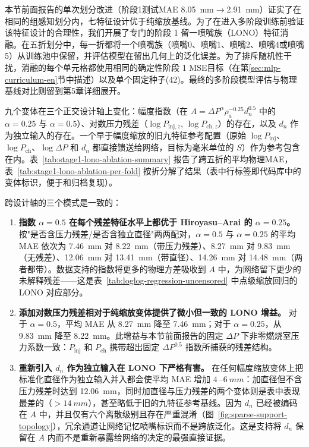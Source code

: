 本节前面报告的单次划分改进（阶段1测试MAE \SI{8.05}{mm}\(\to\)\SI{2.91}{mm}）证实了在相同的组感知划分内，七特征设计优于纯缩放基线。为了在进入多阶段训练前验证该特征设计的合理性，我们开展了专门的阶段 1 留一喷嘴族（LONO）特征消融。在五折划分中，每一折都将一个喷嘴族（喷嘴0、喷嘴1、喷嘴2、喷嘴4或喷嘴5）从训练池中保留，并评估模型在留出几何上的泛化误差。为了排斥随机性干扰，消融的每个单元格都使用相同的确定性阶段 1 MSE目标（在第\ref{sec:mlp-curriculum-en}节中描述）以及单个固定种子(42)。最终的多阶段模型评估与物理基线对比则留到第5章详细展开。

九个变体在三个正交设计轴上变化：幅度指数（在 \(A=\Delta P^{\alpha}\rho_a^{-0.25}d_n^{0.5}\) 中的 \(\alpha=0.25\) 与 \(\alpha=0.5\)）、对数压力残差（\(\log P_{\mathrm{inj},z}\), \(\log P_{\mathrm{ch},z}\)）的存在，以及 \(d_n\) 作为独立输入的存在。一个早于幅度缩放的旧九特征参考配置（原始 \(\log P_{\mathrm{inj}}\)、\(\log P_{\mathrm{ch}}\)、\(\log\Delta P\) 和 \(d_n\) 都直接馈送给网络，目标为毫米单位的 \(S\)）作为参考包含在内。表~\ref{tab:stage1-lono-ablation-summary} 报告了跨五折的平均物理MAE，表~\ref{tab:stage1-lono-ablation-per-fold} 按折分解了结果（表中行标签即代码库中的变体标识，便于和归档复现）。

跨设计轴的三个模式是一致的：
\begin{enumerate}
\item \textbf{指数 \(\alpha=0.5\) 在每个残差特征水平上都优于 Hiroyasu--Arai 的 \(\alpha=0.25\)。} 按"是否含压力残差/是否含独立直径"两两配对，\(\alpha=0.5\) 与 \(\alpha=0.25\) 的平均 MAE 依次为 \SI{7.46}{mm} 对 \SI{8.22}{mm}（带压力残差）、\SI{8.27}{mm} 对 \SI{9.83}{mm}（无残差）、\SI{12.06}{mm} 对 \SI{13.41}{mm}（带直径）、\SI{14.26}{mm} 对 \SI{14.48}{mm}（两者都带）。数据支持的指数将更多的物理方差吸收到 \(A\) 中，为网络留下更少的未解释残差——这是表~\ref{tab:loglog-regression-uncensored} 中点级缩放回归的 LONO 对应部分。
\item \textbf{添加对数压力残差相对于纯缩放变体提供了微小但一致的 LONO 增益。} 对于 \(\alpha=0.5\)，平均 MAE 从 \SI{8.27}{mm} 降至 \SI{7.46}{mm}；对于 \(\alpha=0.25\)，从 \SI{9.83}{mm} 降至 \SI{8.22}{mm}。此增益与本节前面报告的固定 \(\Delta P\) 下非零燃烧室压力系数一致：\(P_{\mathrm{inj}}\) 和 \(P_{\mathrm{ch}}\) 携带超出固定 \(\Delta P^{0.5}\) 指数所捕获的残差结构。
\item \textbf{重新引入 \(d_n\) 作为独立输入在 LONO 下严格有害。} 在任何幅度缩放变体上把标准化直径作为独立输入并入都会使平均 MAE 增加 \(\SI{4}{}\)--\(\SI{6}{mm}\)：加直径但不含压力残差时达到 \SI{12.06}{mm}，同时加直径与压力残差的两个变体则是表中表现最差的（\(>\SI{14}{mm}\)），甚至略低于旧的九特征参考基线。因为 \(d_n\) 已经被编码在 \(A\) 中，并且仅有六个离散级别且存在严重混淆（图~\ref{fig:sparse-support-topology}），冗余通道让网络记忆喷嘴标识而不是跨族泛化。这是支持将 \(d_n\) 保留在 \(A\) 内而不是重新暴露给网络的决定的最强直接证据。
\end{enumerate}

